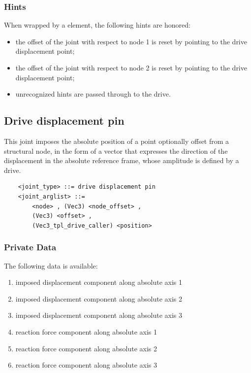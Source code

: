 \subsubsection{Hints}
When wrapped by a  element, the following hints are honored:
\begin{itemize}
\item {} the offset of the joint
with respect to node 1 is reset by pointing 
to the drive displacement point;
\item {} the offset of the joint
with respect to node 2 is reset by pointing 
to the drive displacement point;
\item unrecognized hints are passed through to the  drive.
\end{itemize}



\subsection{Drive displacement pin}
\label{sec:EL:JOINT:DRIVEDISPLACEMENTPIN}
This joint imposes the absolute position of a point optionally offset
from a structural node, in the form of a vector that expresses 
the direction of the displacement in the absolute reference frame,
whose amplitude is defined by a drive.
\begin{verbatim}
    <joint_type> ::= drive displacement pin
    <joint_arglist> ::= 
        <node> , (Vec3) <node_offset> ,
        (Vec3) <offset> ,
        (Vec3_tpl_drive_caller) <position>
\end{verbatim}

\subsubsection{Private Data}
The following data is available:
\begin{enumerate}
\item {} imposed displacement component along absolute axis 1
\item {} imposed displacement component along absolute axis 2
\item {} imposed displacement component along absolute axis 3
\item {} reaction force component along absolute axis 1
\item {} reaction force component along absolute axis 2
\item {} reaction force component along absolute axis 3
\end{enumerate}

